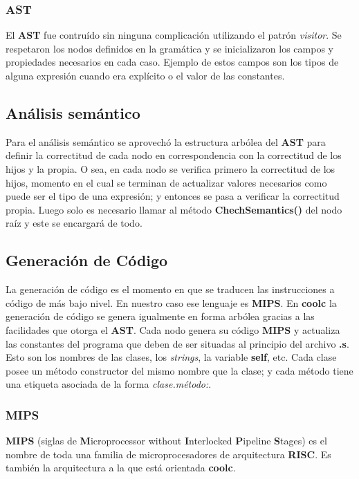 \documentclass[]{article}
\begin{document}
		\subsubsection{AST}\label{sec:ast}
			El \textbf{AST} fue contruído sin ninguna complicación utilizando el patrón \textit{visitor}. Se respetaron los nodos definidos en la gramática y se inicializaron los campos y propiedades necesarios en cada caso. Ejemplo de estos campos son los tipos de alguna expresión cuando era explícito o el valor de las constantes.
			
	\subsection{Análisis semántico}\label{sec:asem}
		Para el análisis semántico se aprovechó la estructura arbólea del \textbf{AST} para definir la correctitud de cada nodo en correspondencia con la correctitud de los hijos y la propia. O sea, en cada nodo se verifica primero la correctitud de los hijos, momento en el cual se terminan de actualizar valores necesarios como puede ser el tipo de una expresión; y entonces se pasa a verificar la correctitud propia. Luego solo es necesario llamar al método \textbf{ChechSemantics()} del nodo raíz y este se encargará de todo. 

	\subsection{Generación de Código}\label{sec:gcod}
		La generación de código es el momento en que se traducen las instrucciones a código de más bajo nivel. En nuestro caso ese lenguaje es \textbf{MIPS}. En \textbf{coolc} la generación de código se genera igualmente en forma arbólea gracias a las facilidades que otorga el \textbf{AST}. Cada nodo genera su código \textbf{MIPS} y actualiza las constantes del programa que deben de ser situadas al principio del archivo \textbf{.s}. Esto son los nombres de las clases, los \textit{strings}, la variable \textbf{self}, etc. Cada clase posee un método constructor del mismo nombre que la clase; y cada método tiene una etiqueta asociada de la forma \textit{clase.método:}.
		\subsubsection{MIPS}\label{sec:mips}
			\textbf{MIPS} (siglas de \textbf{M}icroprocessor without \textbf{I}nterlocked \textbf{P}ipeline \textbf{S}tages) es el nombre de toda una familia de microprocesadores de arquitectura \textbf{RISC}. Es también la arquitectura a la que está orientada \textbf{coolc}.
\end{document}
